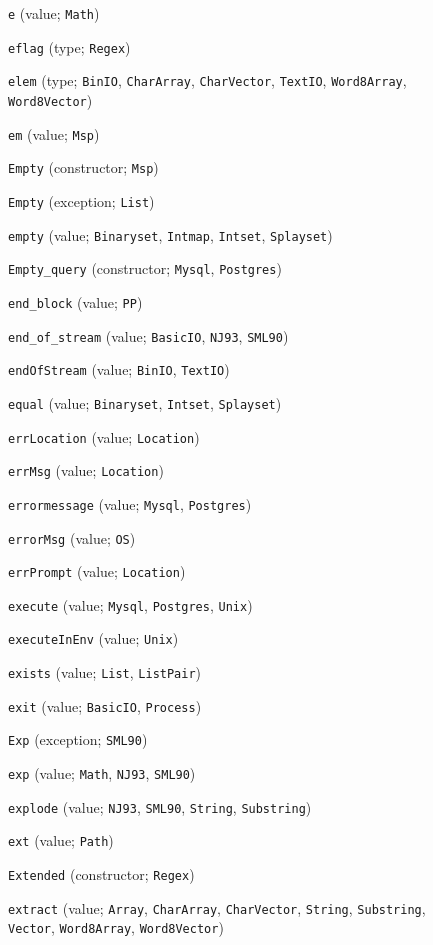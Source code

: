 \begin{description}
\item[] \verb"e" (value; \verb"Math")
\item[] \verb"eflag" (type; \verb"Regex")
\item[] \verb"elem" (type; \verb"BinIO", \verb"CharArray", \verb"CharVector", \verb"TextIO", \verb"Word8Array", \verb"Word8Vector")
\item[] \verb"em" (value; \verb"Msp")
\item[] \verb"Empty" (constructor; \verb"Msp")
\item[] \verb"Empty" (exception; \verb"List")
\item[] \verb"empty" (value; \verb"Binaryset", \verb"Intmap", \verb"Intset", \verb"Splayset")
\item[] \verb"Empty_query" (constructor; \verb"Mysql", \verb"Postgres")
\item[] \verb"end_block" (value; \verb"PP")
\item[] \verb"end_of_stream" (value; \verb"BasicIO", \verb"NJ93", \verb"SML90")
\item[] \verb"endOfStream" (value; \verb"BinIO", \verb"TextIO")
\item[] \verb"equal" (value; \verb"Binaryset", \verb"Intset", \verb"Splayset")
\item[] \verb"errLocation" (value; \verb"Location")
\item[] \verb"errMsg" (value; \verb"Location")
\item[] \verb"errormessage" (value; \verb"Mysql", \verb"Postgres")
\item[] \verb"errorMsg" (value; \verb"OS")
\item[] \verb"errPrompt" (value; \verb"Location")
\item[] \verb"execute" (value; \verb"Mysql", \verb"Postgres", \verb"Unix")
\item[] \verb"executeInEnv" (value; \verb"Unix")
\item[] \verb"exists" (value; \verb"List", \verb"ListPair")
\item[] \verb"exit" (value; \verb"BasicIO", \verb"Process")
\item[] \verb"Exp" (exception; \verb"SML90")
\item[] \verb"exp" (value; \verb"Math", \verb"NJ93", \verb"SML90")
\item[] \verb"explode" (value; \verb"NJ93", \verb"SML90", \verb"String", \verb"Substring")
\item[] \verb"ext" (value; \verb"Path")
\item[] \verb"Extended" (constructor; \verb"Regex")
\item[] \verb"extract" (value; \verb"Array", \verb"CharArray", \verb"CharVector", \verb"String", \verb"Substring", \verb"Vector", \verb"Word8Array", \verb"Word8Vector")
\\[2ex]


\end{description}
